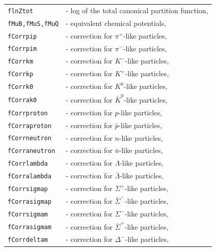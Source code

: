 \documentclass{elsarticle}
\begin{document}
\begin{tabular}{ll}
\texttt{flnZtot}         &- log of the total canonical partition function,\\  
\texttt{fMuB,fMuS,fMuQ}  &- equivalent chemical potentials,\\
\texttt{fCorrpip}        &- correction for $\pi^+$-like particles,\\
\texttt{fCorrpim}        &- correction for $\pi^-$-like particles,\\
\texttt{fCorrkm}         &- correction for $K^-$-like particles,\\
\texttt{fCorrkp}         &- correction for $K^+$-like particles,\\
\texttt{fCorrk0}         &- correction for $K^0$-like particles,\\
\texttt{fCorrak0}        &- correction for $\bar{K}^0$-like particles,\\
\texttt{fCorrproton}     &- correction for $p$-like particles,\\
\texttt{fCorraproton}    &- correction for $\bar{p}$-like particles,\\
\texttt{fCorrneutron}    &- correction for $n$-like particles,\\
\texttt{fCorraneutron}   &- correction for $\bar{n}$-like particles,\\
\texttt{fCorrlambda}     &- correction for $\Lambda$-like particles,\\
\texttt{fCorralambda}    &- correction for $\bar{\Lambda}$-like particles,\\
\texttt{fCorrsigmap}     &- correction for $\Sigma^+$-like particles,\\
\texttt{fCorrasigmap}    &- correction for $\bar{\Sigma}^-$-like particles,\\
\texttt{fCorrsigmam}     &- correction for $\Sigma^-$-like particles,\\
\texttt{fCorrasigmam}    &- correction for $\bar{\Sigma}^+$-like particles,\\
\texttt{fCorrdeltam}     &- correction for $\Delta^-$-like particles,
\end{tabular}
\end{document}
